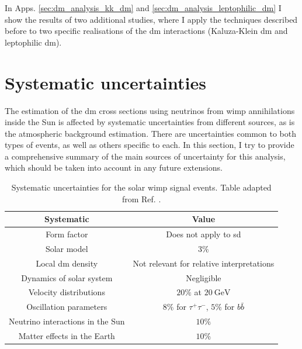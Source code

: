 In Apps. \ref{sec:dm_analysis_kk_dm} and \ref{sec:dm_analysis_leptophilic_dm} I show the results of two additional studies, where I apply the techniques described before to two specific realisations of the \gls{dm} interactions (Kaluza-Klein \gls{dm} and leptophilic \gls{dm}).

\section{Systematic uncertainties}
\label{sec:dm_analysis_systematics}

The estimation of the \gls{dm} cross sections using neutrinos from \gls{wimp} annihilations inside the Sun is affected by systematic uncertainties from different sources, as is the atmospheric background estimation. There are uncertainties common to both types of events, as well as others specific to each. In this section, I try to provide a comprehensive summary of the main sources of uncertainty for this analysis, which should be taken into account in any future extensions.

\begin{table}[t]
	\caption[Systematic uncertainties for the solar \gls{wimp} signal events.]{Systematic uncertainties for the solar \gls{wimp} signal events. Table adapted from Ref. \cite{Principato2021}.}
	\begin{center}
		\begin{small}
			\begin{tabular}{c|c}
				Systematic                         & Value \\[2mm] \hline
				\rule{0pt}{1.1\normalbaselineskip}Form factor                      & Does not apply to \gls{sd} \cite{Wikstroem2009} \\[2mm]
				Solar model                      & $3\%$ \cite{Wikstroem2009} \\[2mm]
				Local \gls{dm} density                 & Not relevant for relative interpretations \cite{Wikstroem2009,Super-Kamiokande2015} \\[2mm]
				Dynamics of solar system         & Negligible \cite{Rott2011} \\[2mm]
				Velocity distributions           & $20\%$ at $20~\mathrm{GeV}$ \cite{Wikstroem2009,Super-Kamiokande2015} \\[2mm] \hline
				\rule{0pt}{1.1\normalbaselineskip}Oscillation parameters           & $8\%$ for $\tau^{+}\tau^{-}$, $5\%$ for $b\bar{b}$ \cite{Boliev2013} \\[2mm]
				Neutrino interactions in the Sun & $10\%$ \\[2mm]
				Matter effects in the Earth      & $10\%$ 
			\end{tabular}
		\end{small}
	\end{center}
	\label{tab:solar_dm_signal_uncertainties}
\end{table}

